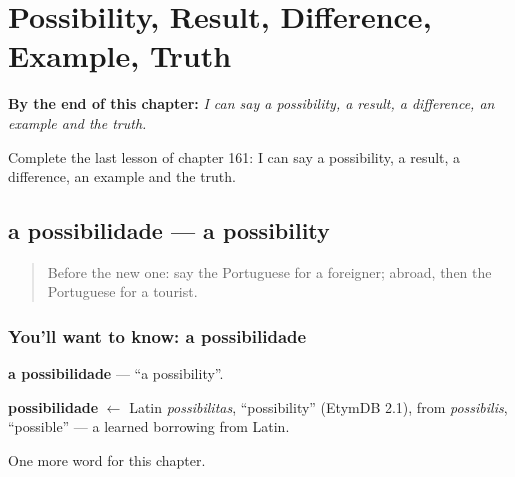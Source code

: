 
\chapter{Possibility, Result, Difference, Example, Truth}
\label{ch:pt-possibility-result-difference-example-truth}

\begin{chapteropening}
\textbf{By the end of this chapter:} \emph{I can say a possibility, a result, a difference, an example and the truth.}

Complete the last lesson of chapter 161: I can say a possibility, a result, a difference, an example and the truth.
\end{chapteropening}

\section[a possibilidade]{a possibilidade — a possibility}

\label{lesson:PT-C161-possibilidade}



\begin{quote}
Before the new one: say the Portuguese for a foreigner; abroad, then the Portuguese for a tourist.
\end{quote}

\subsection*{You'll want to know: a possibilidade}
\textbf{a possibilidade} — \textquotedblleft{}a possibility\textquotedblright{}.

\begin{cousinweb}
\textbf{possibilidade} $\leftarrow$ Latin \emph{possibilitas}, \textquotedblleft{}possibility\textquotedblright{} (EtymDB 2.1), from \emph{possibilis}, \textquotedblleft{}possible\textquotedblright{} — a learned borrowing from Latin.
\end{cousinweb}

\begin{grammarlens}[title={What you've built}]
One more word for this chapter.
\end{grammarlens}

